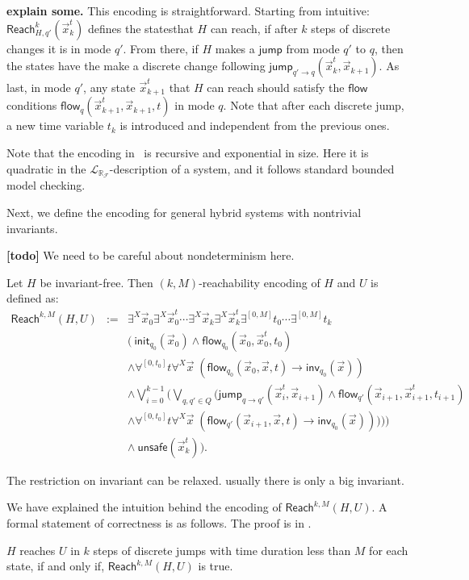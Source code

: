 \documentclass[envcountsect]{llncs}
\newcommand{\flow}{\mathsf{flow}}
\newcommand{\jump}{\mathsf{jump}}
\newcommand{\inv}{\mathsf{inv}}
\newcommand{\init}{\mathsf{init}}
\newcommand{\reach}{\mathsf{Reach}}
\newcommand{\unsafe}{\mathsf{unsafe}}
\newcommand{\lrf}{\mathcal{L}_{\mathbb{R}_{\mathcal{F}}}}
\begin{document}
{\bf explain some.} This encoding is straightforward. Starting from intuitive:
$\reach_{H,q'}^k(\vec x_k^t)$ defines the statesthat $H$ can reach, if after $k$
steps of discrete changes it is in mode $q'$.
From there, if $H$ makes a $\jump$ from mode $q'$ to $q$, then the states have
the make a discrete change following $\jump_{q'\rightarrow q}(\vec x_k^t, \vec
x_{k+1})$. As last, in mode $q'$, any state $\vec x_{k+1}^t$ that $H$ can reach
should satisfy the $\flow$ conditions $\flow_q(\vec x_{k+1}^t, \vec x_{k+1}, t)$
in mode $q$. Note that after each discrete jump, a new time variable $t_k$ is
introduced and independent from the previous ones.
\begin{remark}
Note that the encoding in~\cite{} is recursive and exponential in size. Here it
is quadratic in the $\lrf$-description of a system, and it follows standard
bounded model checking. 
\end{remark}
Next, we define the encoding for general hybrid systems with nontrivial
invariants. 
\begin{remark}
{\bf [todo]} We need to be careful about nondeterminism here. 
\end{remark}
\begin{definition}[$\reach^{k,M}(H,U)$, general case]
Let $H$ be invariant-free. Then $(k,M)$-reachability encoding of $H$ and $U$ is
defined as:
\begin{eqnarray*}
\reach^{k,M}(H,U) &:=&\exists^X \vec x_0 \exists^X\vec x_0^t\cdots \exists^X\vec
x_k\exists^X \vec x_k^t \exists^{[0,M]}t_0\cdots \exists^{[0,M]}t_k\\
& &\Big(\ \init_{q_0}(\vec x_0)\wedge \flow_{q_0}(\vec x_0, \vec x_0^t,
t_0)\\
& &\wedge \forall^{[0,t_0]}t\forall^X\vec x\;(\flow_{q_0}(\vec x_0, \vec x,
t)\rightarrow \inv_{q_0}(\vec x)) \\
& &\wedge 
\bigvee_{i=0}^{k-1}\Big( \bigvee_{q, q'\in Q} \Big(\jump_{q\rightarrow q'}(\vec
x_i^t, \vec x_{i+1})\wedge \flow_{q'}(\vec x_{i+1}, \vec
x_{i+1}^t, t_{i+1})\\
& &\wedge \forall^{[0,t_0]}t\forall^X\vec x\;(\flow_{q'}(\vec x_{i+1}, \vec x,
t)\rightarrow \inv_{q_0}(\vec x)) )\Big)\Big)\\
& &\wedge\ \unsafe(\vec x_{k}^t)\Big). 
\end{eqnarray*}
\end{definition}

\begin{remark}[{\bf TODO}]
The restriction on invariant can be relaxed. usually there is only a big
invariant.
\end{remark}
We have explained the intuition behind the encoding of $\reach^{k,M}(H,U)$. A
formal statement of correctness is as follows. The proof is in \cite{}. 
\begin{proposition}
$H$ reaches $U$ in $k$ steps of discrete jumps with time duration
less than $M$ for each state, if and only if, $\reach^{k,M}(H,U)$ is true.
\end{proposition}
\end{document}
